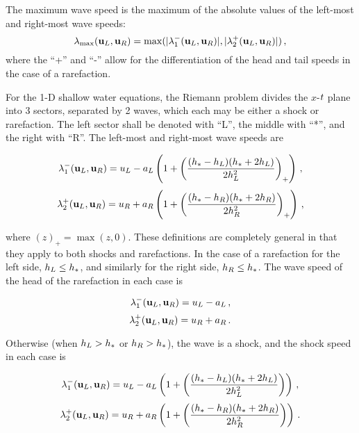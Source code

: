 The maximum wave speed is the maximum of the absolute values of the
left-most and right-most wave speeds:
\begin{equation}
  \lambda_{\text{max}}(\mathbf{u}_L, \mathbf{u}_R)
  = \max(|\lambda_1^-(\mathbf{u}_L, \mathbf{u}_R)|
  ,|\lambda_2^+(\mathbf{u}_L, \mathbf{u}_R)|)
  \,,
\end{equation}
where the ``+'' and ``-'' allow for the differentiation of the head
and tail speeds in the case of a rarefaction.

For the 1-D shallow water equations, the Riemann problem divides the
$x$-$t$ plane into 3 sectors, separated by 2 waves, which
each may be either a shock or rarefaction. The left sector shall be
denoted with ``L'', the middle with ``*'', and the right with ``R''.
The left-most and right-most wave speeds are

\begin{equation}
  \lambda_1^-(\mathbf{u}_L, \mathbf{u}_R)
    = u_L - a_L\left(1 + \left(
    \frac{(h_* - h_L)(h_* + 2h_L)}{2h_L^2}\right)_+\right)
    \,,
\end{equation}
\begin{equation}
  \lambda_2^+(\mathbf{u}_L, \mathbf{u}_R)
    = u_R + a_R\left(1 + \left(
    \frac{(h_* - h_R)(h_* + 2h_R)}{2h_R^2}\right)_+\right)
    \,,
\end{equation}

where $(z)_+=\max(z,0)$. These definitions are completely general in that
they apply to both shocks and rarefactions. In the case of a rarefaction
for the left side, $h_L \leq h_*$, and similarly for the right
side, $h_R \leq h_*$. The wave speed of the head of the rarefaction
in each case is

\begin{equation}
  \lambda_1^-(\mathbf{u}_L, \mathbf{u}_R)
    = u_L - a_L
    \,,
\end{equation}
\begin{equation}
  \lambda_2^+(\mathbf{u}_L, \mathbf{u}_R)
    = u_R + a_R
    \,.
\end{equation}

Otherwise (when $h_L > h_*$ or $h_R > h_*$), the
wave is a shock, and the shock speed in each case is

\begin{equation}
  \lambda_1^-(\mathbf{u}_L, \mathbf{u}_R)
    = u_L - a_L\left(1 + \left(
    \frac{(h_* - h_L)(h_* + 2h_L)}{2h_L^2}\right)\right)
    \,,
\end{equation}
\begin{equation}
  \lambda_2^+(\mathbf{u}_L, \mathbf{u}_R)
    = u_R + a_R\left(1 + \left(
    \frac{(h_* - h_R)(h_* + 2h_R)}{2h_R^2}\right)\right)
    \,.
\end{equation}

